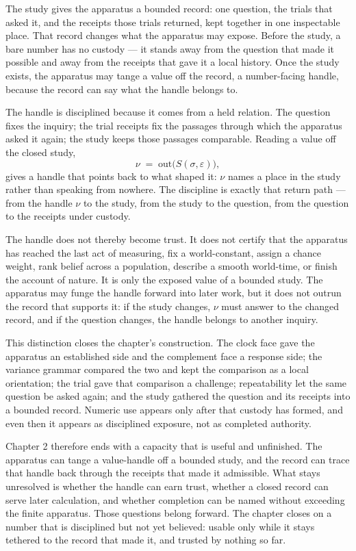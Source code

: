 The study gives the apparatus a bounded record: one question, the trials that asked it, and the receipts those trials returned, kept together in one inspectable place. That record changes what the apparatus may expose. Before the study, a bare number has no custody --- it stands away from the question that made it possible and away from the receipts that gave it a local history. Once the study exists, the apparatus may tange a value off the record, a number-facing handle, because the record can say what the handle belongs to.

The handle is disciplined because it comes from a held relation. The question fixes the inquiry; the trial receipts fix the passages through which the apparatus asked it again; the study keeps those passages comparable. Reading a value off the closed study,
\[ \nu \;=\; \mathrm{out}\big(S(\sigma,\varepsilon)\big), \]
gives a handle that points back to what shaped it: $\nu$ names a place in the study rather than speaking from nowhere. The discipline is exactly that return path --- from the handle $\nu$ to the study, from the study to the question, from the question to the receipts under custody.

The handle does not thereby become trust. It does not certify that the apparatus has reached the last act of measuring, fix a world-constant, assign a chance weight, rank belief across a population, describe a smooth world-time, or finish the account of nature. It is only the exposed value of a bounded study. The apparatus may funge the handle forward into later work, but it does not outrun the record that supports it: if the study changes, $\nu$ must answer to the changed record, and if the question changes, the handle belongs to another inquiry.

This distinction closes the chapter's construction. The clock face gave the apparatus an established side and the complement face a response side; the variance grammar compared the two and kept the comparison as a local orientation; the trial gave that comparison a challenge; repeatability let the same question be asked again; and the study gathered the question and its receipts into a bounded record. Numeric use appears only after that custody has formed, and even then it appears as disciplined exposure, not as completed authority.

Chapter 2 therefore ends with a capacity that is useful and unfinished. The apparatus can tange a value-handle off a bounded study, and the record can trace that handle back through the receipts that made it admissible. What stays unresolved is whether the handle can earn trust, whether a closed record can serve later calculation, and whether completion can be named without exceeding the finite apparatus. Those questions belong forward. The chapter closes on a number that is disciplined but not yet believed: usable only while it stays tethered to the record that made it, and trusted by nothing so far.

